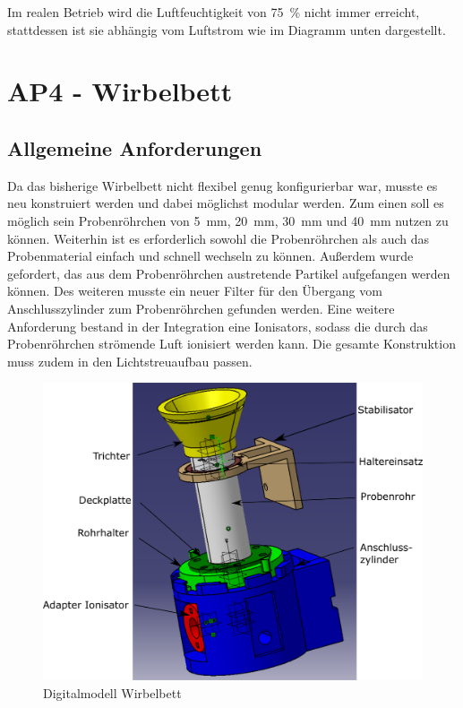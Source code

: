 Im realen Betrieb wird die Luftfeuchtigkeit von \SI{75}{\%} nicht immer erreicht, stattdessen ist sie abhängig vom Luftstrom wie im Diagramm unten dargestellt.



\newpage

\section{AP4 - Wirbelbett}


\subsection{Allgemeine Anforderungen}

Da das bisherige Wirbelbett nicht flexibel genug konfigurierbar war, musste es neu konstruiert werden und dabei möglichst modular werden. Zum einen soll es möglich sein Probenröhrchen von \SI{5}{mm}, \SI{20}{mm}, \SI{30}{mm} und \SI{40}{mm} nutzen zu können. Weiterhin ist es erforderlich sowohl die Probenröhrchen als auch das Probenmaterial einfach und schnell wechseln zu können. Außerdem wurde gefordert, das aus dem Probenröhrchen austretende Partikel aufgefangen werden können. Des weiteren musste ein neuer Filter für den Übergang vom Anschlusszylinder zum Probenröhrchen gefunden werden. 
Eine weitere Anforderung bestand in der Integration eine Ionisators, sodass die durch das Probenröhrchen strömende Luft ionisiert werden kann. Die gesamte Konstruktion muss zudem in den Lichtstreuaufbau passen. \\




\begin{figure}[h]
	\begin{center}
		\includegraphics[scale=0.4]{Zusammenbau_fluides_Bett.png}
		\caption{Digitalmodell Wirbelbett}
	\end{center}
\end{figure}


